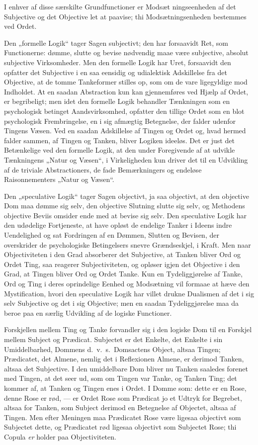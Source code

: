 \documentclass[12pt]{book}
\newcommand{\opage}[1]{\marginnote{\footnotesize\textit{[#1]}}}
\begin{document}
I enhver af disse særskilte Grundfunctioner er Modsæt\opage{13}%
ningseenheden af det Subjective og det Objective let at paavise; thi Modsætningsenheden bestemmes ved Ordet.

Den „formelle Logik“ tager Sagen subjectivt; den har forsaavidt Ret, som Functionerne: dømme, slutte og bevise nødvendig maae være subjective, absolut subjective Virksomheder. Men den formelle Logik har Uret, forsaavidt den opfatter det Subjective i en saa eensidig og udialektisk Adskillelse fra det Objective, at de tomme Tankeformer stilles op, som om de vare ligegyldige mod Indholdet. At en saadan Abstraction kun kan gjennemføres ved Hjælp af Ordet, er begribeligt; men idet den formelle Logik behandler Tænkningen som en psychologisk betinget Aandsvirksomhed, opfatter den tillige Ordet som en blot psychologisk Frembringelse, en i sig afmægtig Betegnelse, der falder udenfor Tingens Væsen. Ved en saadan Adskillelse af Tingen og Ordet og, hvad hermed falder sammen, af Tingen og Tanken, bliver Logiken ideeløs. Det er just det Betænkelige ved den formelle Logik, at den under Foregivende af at udvikle Tænkningens „Natur og Væsen“, i Virkeligheden kun driver det til en Udvikling af de triviale Abstractioners, de fade Bemærkningers og endeløse Raisonnementers „Natur og Væsen“.

Den „speculative Logik“ tager Sagen objectivt, ja saa objectivt, at den objective Dom maa dømme sig selv, den objective Slutning slutte sig selv, og Methodens objective Beviis omsider ende med at bevise sig selv. Den speculative Logik har den udødelige Fortjeneste, at have opløst de endelige Tanker i Ideens indre Uendelighed og sat Fordringen af en Dømmen, Slutten og Bevisen, der overskrider de psychologiske Betingelsers snevre Grændseskjel, i Kraft. Men naar Objectiviteten i den Grad absorberer det Subjective, at Tanken bliver Ord og Ordet Ting, saa reagerer Subjectiviteten, og opløser igjen det Objective i den Grad, at Tingen bliver Ord og Ordet Tanke. Kun en Tydeliggjørelse af Tanke, Ord og Ting i deres oprindelige Eenhed og Modsætning vil
\opage{14}formaae at hæve den Mystification, hvori den speculative Logik har villet drukne Dualismen af det i sig selv Subjective og det i sig Objective; men en saadan Tydeliggjørelse maa da beroe paa en særlig Udvikling af de logiske Functioner.

Forskjellen mellem Ting og Tanke forvandler sig i den logiske Dom til en Forskjel mellem Subject og Prædicat. Subjectet er det Enkelte, det Enkelte i sin Umiddelbarhed, Dommens d.\ v.\ s.\ Domsactens Object, altsaa Tingen; Prædicatet, det Almene, nemlig det i Reflexionen Almene, er derimod Tanken, altsaa det Subjective. I den umiddelbare Dom bliver nu Tanken saaledes forenet med Tingen, at det seer ud, som om Tingen var Tanke, og Tanken Ting; det kommer af, at Tanken og Tingen enes i Ordet. I Domme som: dette er en Rose, denne Rose er rød, --- er Ordet Rose som Prædicat jo et Udtryk for Begrebet, altsaa for Tanken, som Subject derimod en Betegnelse af Objectet, altsaa af Tingen. Men efter Meningen maa Prædicatet Rose være ligesaa objectivt som Subjectet dette, og Prædicatet rød ligesaa objectivt som Subjectet Rose; thi Copula \emph{er} holder paa Objectiviteten.
\end{document}
